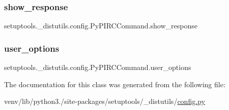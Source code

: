 \subsubsection{\texorpdfstring{show\+\_\+response}{show\_response}}
{\footnotesize\ttfamily setuptools.\+\_\+distutils.\+config.\+Py\+P\+I\+R\+C\+Command.\+show\+\_\+response}

\mbox{\label{classsetuptools_1_1__distutils_1_1config_1_1PyPIRCCommand_a5d675b717841d865b995e2e46413032e}} 
\subsubsection{\texorpdfstring{user\+\_\+options}{user\_options}}
{\footnotesize\ttfamily setuptools.\+\_\+distutils.\+config.\+Py\+P\+I\+R\+C\+Command.\+user\+\_\+options\hspace{0.3cm}{\ttfamily [static]}}



The documentation for this class was generated from the following file\+:\begin{DoxyCompactItemize}
\item 
venv/lib/python3./site-\/packages/setuptools/\+\_\+distutils/\hyperlink{setuptools_2__distutils_2config_8py}{config.\+py}\end{DoxyCompactItemize}
